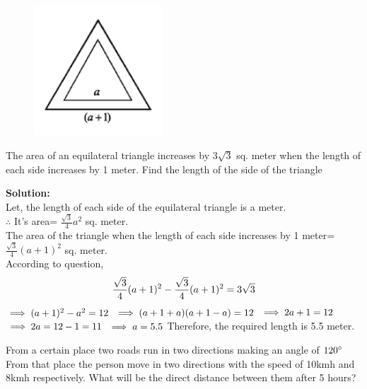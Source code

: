 \begin{figure}
	\includegraphics[width=1.9in]{pics/e2}
\end{figure}
\begin{exmp}
	The area of an equilateral triangle increases by $3\sqrt{3}$ sq. meter when the length of each side increases by 1 meter. Find the length of the side of the triangle
\end{exmp}


\textbf{Solution:\\}Let, the length of each side of the equilateral triangle is a meter.\\
$\therefore$ It's area= $\frac{\sqrt{3}}{4}a^2$ sq. meter.\\
The area of the triangle when the length of each side increases by 1 meter= $\frac{\sqrt{3}}{4}(a+1)^2$ sq. meter.\\

According to question, $$\displaystyle\frac{\sqrt{3}}{4}(a+1)^2-\frac{\sqrt{3}}{4}(a+1)^2=3\sqrt{3}$$
$\implies (a+1)^2-a^2=12\\$
$\implies (a+1+a)(a+1-a)=12\\$
$\implies 2a+1=12\\$
$\implies 2a=12-1=11\\$
$\implies a=5.5\\$
Therefore, the required length is 5.5 meter.





\begin{exmp}
	From a certain place two roads run in two directions making an angle of $120\degree$ From that place the person move in two directions with the speed of 10kmh and 8kmh respectively. What will be the direct distance between them after 5 hours?
\end{exmp}

